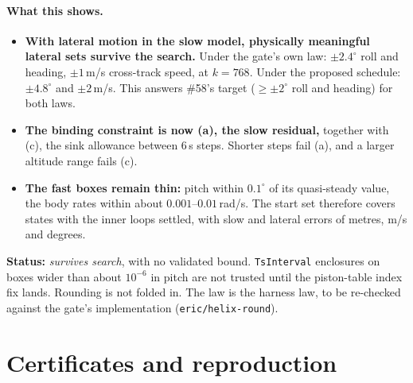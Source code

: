 \documentclass[11pt]{article}
\begin{document}
\paragraph{What this shows.}
\begin{itemize}
\item \textbf{With lateral motion in the slow model, physically meaningful lateral sets survive the search.} Under the gate's own law: $\pm2.4^\circ$ roll and heading, $\pm1$\,m/s cross-track speed, at $k = 768$. Under the proposed schedule: $\pm4.8^\circ$ and $\pm2$\,m/s. This answers \#58's target ($\ge \pm2^\circ$ roll and heading) for both laws.
\item \textbf{The binding constraint is now (a), the slow residual,} together with (c), the sink allowance between 6\,s steps. Shorter steps fail (a), and a larger altitude range fails (c).
\item \textbf{The fast boxes remain thin:} pitch within $0.1^\circ$ of its quasi-steady value, the body rates within about $0.001$--$0.01$\,rad/s. The start set therefore covers states with the inner loops settled, with slow and lateral errors of metres, m/s and degrees.
\end{itemize}

\textbf{Status:} \emph{survives search}, with no validated bound. \texttt{TsInterval} enclosures on boxes wider than about $10^{-6}$ in pitch are not trusted until the piston-table index fix lands. Rounding is not folded in. The law is the harness law, to be re-checked against the gate's implementation (\texttt{eric/helix-round}).

\section{Certificates and reproduction}\label{sec:certs}
\end{document}
